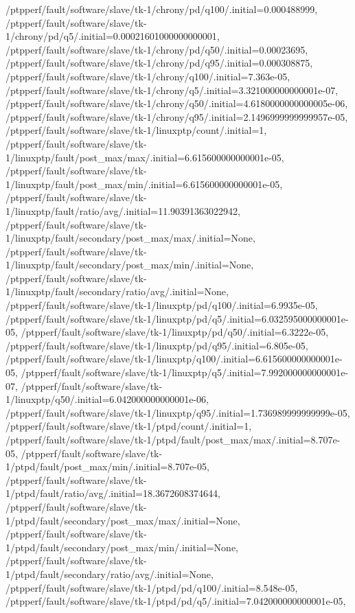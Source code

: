 {    /ptpperf/fault/software/slave/tk-1/chrony/pd/q100/.initial=0.000488999,
    /ptpperf/fault/software/slave/tk-1/chrony/pd/q5/.initial=0.00021601000000000001,
    /ptpperf/fault/software/slave/tk-1/chrony/pd/q50/.initial=0.00023695,
    /ptpperf/fault/software/slave/tk-1/chrony/pd/q95/.initial=0.000308875,
    /ptpperf/fault/software/slave/tk-1/chrony/q100/.initial=7.363e-05,
    /ptpperf/fault/software/slave/tk-1/chrony/q5/.initial=3.321000000000001e-07,
    /ptpperf/fault/software/slave/tk-1/chrony/q50/.initial=4.6180000000000005e-06,
    /ptpperf/fault/software/slave/tk-1/chrony/q95/.initial=2.1496999999999957e-05,
    /ptpperf/fault/software/slave/tk-1/linuxptp/count/.initial=1,
    /ptpperf/fault/software/slave/tk-1/linuxptp/fault/post_max/max/.initial=6.615600000000001e-05,
    /ptpperf/fault/software/slave/tk-1/linuxptp/fault/post_max/min/.initial=6.615600000000001e-05,
    /ptpperf/fault/software/slave/tk-1/linuxptp/fault/ratio/avg/.initial=11.90391363022942,
    /ptpperf/fault/software/slave/tk-1/linuxptp/fault/secondary/post_max/max/.initial=None,
    /ptpperf/fault/software/slave/tk-1/linuxptp/fault/secondary/post_max/min/.initial=None,
    /ptpperf/fault/software/slave/tk-1/linuxptp/fault/secondary/ratio/avg/.initial=None,
    /ptpperf/fault/software/slave/tk-1/linuxptp/pd/q100/.initial=6.9935e-05,
    /ptpperf/fault/software/slave/tk-1/linuxptp/pd/q5/.initial=6.032595000000001e-05,
    /ptpperf/fault/software/slave/tk-1/linuxptp/pd/q50/.initial=6.3222e-05,
    /ptpperf/fault/software/slave/tk-1/linuxptp/pd/q95/.initial=6.805e-05,
    /ptpperf/fault/software/slave/tk-1/linuxptp/q100/.initial=6.615600000000001e-05,
    /ptpperf/fault/software/slave/tk-1/linuxptp/q5/.initial=7.992000000000001e-07,
    /ptpperf/fault/software/slave/tk-1/linuxptp/q50/.initial=6.042000000000001e-06,
    /ptpperf/fault/software/slave/tk-1/linuxptp/q95/.initial=1.736989999999999e-05,
    /ptpperf/fault/software/slave/tk-1/ptpd/count/.initial=1,
    /ptpperf/fault/software/slave/tk-1/ptpd/fault/post_max/max/.initial=8.707e-05,
    /ptpperf/fault/software/slave/tk-1/ptpd/fault/post_max/min/.initial=8.707e-05,
    /ptpperf/fault/software/slave/tk-1/ptpd/fault/ratio/avg/.initial=18.3672608374644,
    /ptpperf/fault/software/slave/tk-1/ptpd/fault/secondary/post_max/max/.initial=None,
    /ptpperf/fault/software/slave/tk-1/ptpd/fault/secondary/post_max/min/.initial=None,
    /ptpperf/fault/software/slave/tk-1/ptpd/fault/secondary/ratio/avg/.initial=None,
    /ptpperf/fault/software/slave/tk-1/ptpd/pd/q100/.initial=8.548e-05,
    /ptpperf/fault/software/slave/tk-1/ptpd/pd/q5/.initial=7.042000000000001e-05,
}
